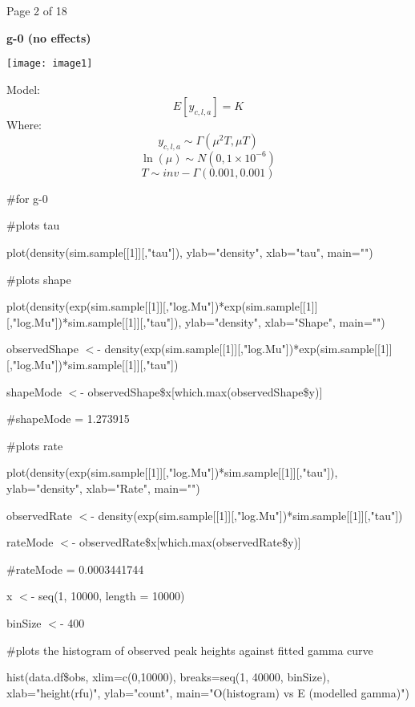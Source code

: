 \documentclass{article} %
\begin{document}


\noindent Page 2 of 18

\noindent 

\noindent \textbf{g-0 (no effects)}

\noindent \texttt{[image: image1]}

\noindent Model:
\[E\left[y_{c,l,a} \right]=K\] 
Where:
\[y_{c,l,a} \sim \Gamma \left(\mu ^{2} T,\mu T\right)\] 
\[\ln (\mu )\sim N(0,1\times 10^{-6} )\] 
\[T\sim inv-\Gamma (0.001,0.001)\] 


\noindent \#for g-0

\noindent \#plots tau

\noindent plot(density(sim.sample[[1]][,"tau"]), ylab="density", xlab="tau", main="")

\noindent 

\noindent \#plots shape

\noindent plot(density(exp(sim.sample[[1]][,"log.Mu"])*exp(sim.sample[[1]][,"log.Mu"])*sim.sample[[1]][,"tau"]), ylab="density", xlab="Shape", main="")

\noindent observedShape $\mathrm{<}$- density(exp(sim.sample[[1]][,"log.Mu"])*exp(sim.sample[[1]][,"log.Mu"])*sim.sample[[1]][,"tau"])

\noindent shapeMode $\mathrm{<}$- observedShape\$x[which.max(observedShape\$y)]

\noindent \#shapeMode = 1.273915

\noindent 

\noindent \#plots rate

\noindent plot(density(exp(sim.sample[[1]][,"log.Mu"])*sim.sample[[1]][,"tau"]), ylab="density", xlab="Rate", main="")

\noindent observedRate $\mathrm{<}$- density(exp(sim.sample[[1]][,"log.Mu"])*sim.sample[[1]][,"tau"])

\noindent rateMode $\mathrm{<}$- observedRate\$x[which.max(observedRate\$y)]

\noindent \#rateMode = 0.0003441744

\noindent 

\noindent x $\mathrm{<}$- seq(1, 10000, length = 10000)

\noindent binSize $\mathrm{<}$- 400

\noindent \#plots the histogram of observed peak heights against fitted gamma curve

\noindent hist(data.df\$obs, xlim=c(0,10000), breaks=seq(1, 40000, binSize), xlab="height(rfu)", ylab="count", main="O(histogram) vs E (modelled gamma)")
\end{document}
